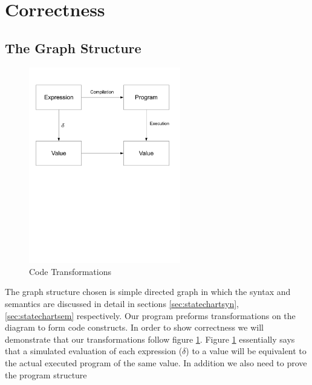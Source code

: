 \section{Correctness}
\subsection{The Graph Structure}
\begin{figure}[htb]
    \centering
    \includegraphics[trim= 10mm 120mm 10mm 10mm, clip, width=250px]{./images/correctness_graph1.pdf}
    \caption{Code Transformations}
    \label{fig:correctness_graph1}
\end{figure}
The graph structure chosen is simple directed graph in which the syntax and semantics are discussed in detail in sections \ref{sec:statechartsyn}, \ref{sec:statechartsem} respectively. Our program preforms transformations on the diagram to form code constructs. In order to show correctness we will demonstrate that our transformations follow figure \ref{fig:correctness_graph1}. Figure \ref{fig:correctness_graph1} essentially says that a simulated evaluation of each expression ($\delta$) to a value will be equivalent to the actual executed program of the same value. In addition we also need to prove the program structure
